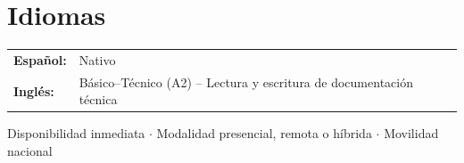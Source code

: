 \documentclass[10pt, letterpaper]{article}
\begin{document}
\section*{Idiomas}
\vspace{-2pt}

\noindent
\begin{tabularx}{\linewidth}{@{}l X@{}}
  \textbf{Español:} & Nativo \\
  \textbf{Inglés:} & Básico--Técnico (A2) -- Lectura y escritura de documentación técnica \\
\end{tabularx}

\vspace{10pt}
\begin{center}
\textcolor{medgray}{\small Disponibilidad inmediata $\cdot$ Modalidad presencial, remota o híbrida $\cdot$ Movilidad nacional}
\end{center}
\end{document}
